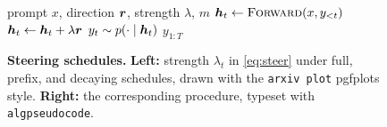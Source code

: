 \begin{figure}[t]
\centering
\begin{minipage}[c]{0.48\linewidth}
\centering
{}
\end{minipage}\hfill
\begin{minipage}[c]{0.48\linewidth}
\begin{algorithm}[H]
\caption{Prefix steering}
\label{alg:prefix}
\begin{algorithmic}[1]
\Require prompt $x$, direction $\boldsymbol{r}$, strength $\lambda$, $m$
  \State $\boldsymbol{h}_t \gets \textsc{Forward}(x, y_{<t})$
    \State $\boldsymbol{h}_t \gets \boldsymbol{h}_t + \lambda \boldsymbol{r}$
  \EndIf
  \State $y_t \sim p(\cdot \mid \boldsymbol{h}_t)$
\EndFor
\State \Return $y_{1:T}$
\end{algorithmic}
\end{algorithm}
\end{minipage}
\caption{\textbf{Steering schedules.} \textbf{Left:} strength $\lambda_t$ in \cref{eq:steer} under full, prefix, and decaying schedules, drawn with the \texttt{arxiv plot} pgfplots style. \textbf{Right:} the corresponding procedure, typeset with \texttt{algpseudocode}.}
\label{fig:schedules}
\end{figure}

